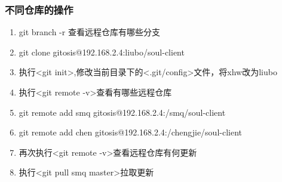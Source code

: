 \subsubsection{不同仓库的操作}
\begin{enumerate}[(1)]
\item git branch -r 查看远程仓库有哪些分支
\item git clone gitosis@192.168.2.4:liubo/soul-client
\item 执行<git init>,修改当前目录下的<.git/config>文件，将xhw改为liubo
\item 执行<git remote -v>查看有哪些远程仓库
\item git remote add smq gitosis@192.168.2.4:/smq/soul-client
\item git remote add chen gitosis@192.168.2.4:/chengjie/soul-client
\item 再次执行<git remote -v>查看远程仓库有何更新
\item 执行<git pull smq master>拉取更新
\end{enumerate}
